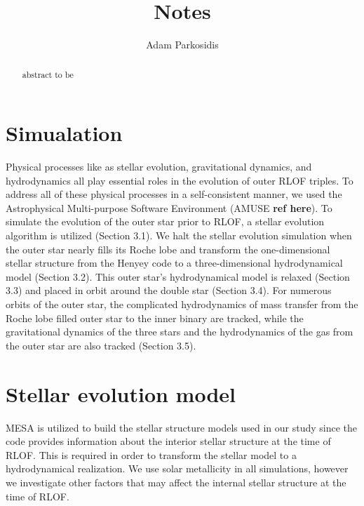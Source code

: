 \documentclass[aps,prb,twocolumn,superscriptaddress,floatfix,longbibliography]{revtex4-2}
\newcommand{\mytitle}{Notes}
\begin{document}
\title{\mytitle}

\author{Adam Parkosidis}

\begin{abstract}
abstract to be
\end{abstract}
\maketitle

\section{Simualation}

Physical processes like as stellar evolution, gravitational dynamics, and hydrodynamics all play essential roles in the evolution of outer RLOF triples. To address all of these physical processes in a self-consistent manner, we used the Astrophysical Multi-purpose Software Environment (AMUSE {\bf ref here}). To simulate the evolution of the outer star prior to RLOF, a stellar evolution algorithm is utilized (Section 3.1). We halt the stellar evolution simulation when the outer star nearly fills its Roche lobe and transform the one-dimensional stellar structure from the Henyey code to a three-dimensional hydrodynamical model (Section 3.2). This outer star's hydrodynamical model is relaxed (Section 3.3) and placed in orbit around the double star (Section 3.4). For numerous orbits of the outer star, the complicated hydrodynamics of mass transfer from the Roche lobe filled outer star to the inner binary are tracked, while the gravitational dynamics of the three stars and the hydrodynamics of the gas from the outer star are also tracked (Section 3.5).


\section{Stellar evolution model}

MESA is utilized to build the stellar structure models used in our study since the code provides information about the interior stellar structure at the time of RLOF. This is required in order to transform the stellar model to a hydrodynamical realization. We use solar metallicity in all simulations, however we investigate other factors that may affect the internal stellar structure  at the time of RLOF.
\end{document}
